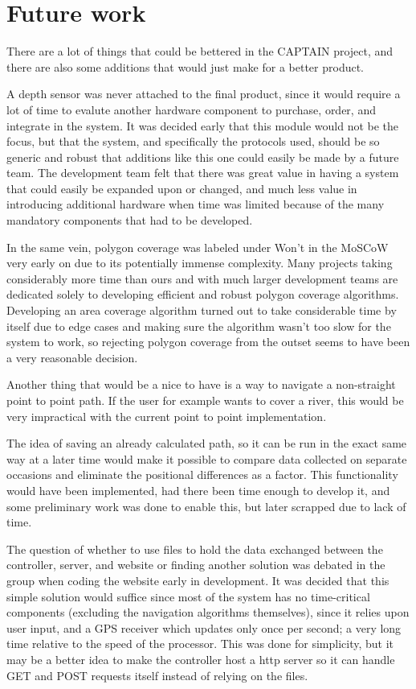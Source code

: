 \chapter{Future work}
There are a lot of things that could be bettered in the CAPTAIN project, and there are also some additions that would just make for a better product.

A depth sensor was never attached to the final product, since it would require a lot of time to evalute another hardware component to purchase, order, and integrate in the system. It was decided early that this module would not be the focus, but that the system, and specifically the protocols used, should be so generic and robust that additions like this one could easily be made by a future team. The development team felt that there was great value in having a system that could easily be expanded upon or changed, and much less value in introducing additional hardware when time was limited because of the many mandatory components that had to be developed. 

In the same vein, polygon coverage was labeled under Won't in the MoSCoW very early on due to its potentially immense complexity. Many projects taking considerably more time than ours and with much larger development teams are dedicated solely to developing efficient and robust polygon coverage algorithms. Developing an area coverage algorithm turned out to take considerable time by itself due to edge cases and making sure the algorithm wasn't too slow for the system to work, so rejecting polygon coverage from the outset seems to have been a very reasonable decision.

Another thing that would be a nice to have is a way to navigate a non-straight point to point path. If the user for example wants to cover a river, this would be very impractical with the current point to point implementation. 

The idea of saving an already calculated path, so it can be run in the exact same way at a later time would make it possible to compare data collected on separate occasions and eliminate the positional differences as a factor. This functionality would have been implemented, had there been time enough to develop it, and some preliminary work was done to enable this, but later scrapped due to lack of time.

The question of whether to use files to hold the data exchanged between the controller, server, and website or finding another solution was debated in the group when coding the website early in development. It was decided that this simple solution would suffice since most of the system has no time-critical components (excluding the navigation algorithms themselves), since it relies upon user input, and a GPS receiver which updates only once per second; a very long time relative to the speed of the processor. This was done for simplicity, but it may be a better idea to make the controller host a http server so it can handle GET and POST requests itself instead of relying on the files. 

